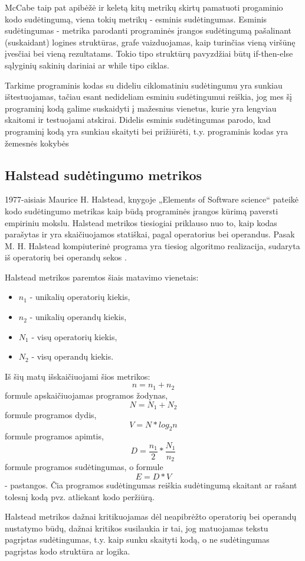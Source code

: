 \documentclass{VUMIFPSbakalaurinis}
\begin{document}
McCabe taip pat apibėžė ir keletą kitų metrikų skirtų pamatuoti progaminio kodo sudėtingumą, viena tokių metrikų - esminis sudėtingumas. Esminis sudėtingumas - metrika parodanti programinės įrangos sudėtingumą pašalinant (suskaidant) logines struktūras, grafe vaizduojamas, kaip turinčias vieną viršūnę įvesčiai bei vieną rezultatams. Tokio tipo struktūrų pavyzdžiai būtų if-then-else sąlyginių sakinių dariniai ar while tipo ciklas.

Tarkime programinis kodas su dideliu ciklomatiniu sudėtingumu yra sunkiau ištestuojamas, tačiau esant nedideliam esminiu sudėtingumui reiškia, jog mes šį programinį kodą galime suskaidyti į mažesnius vienetus, kurie yra lengviau skaitomi ir testuojami atskirai. Didelis esminis sudėtingumas parodo, kad programinį kodą yra sunkiau skaityti bei prižiūrėti, t.y. programinis kodas yra žemesnės kokybės

\subsection{Halstead sudėtingumo metrikos}
1977-aisiais Maurice H. Halstead, knygoje „Elements of Software science“ pateikė kodo sudėtingumo metrikas kaip būdą programinės įrangos kūrimą paversti empiriniu mokslu. Halstead metrikos tiesiogiai priklauso nuo to, kaip kodas parašytas ir yra skaičiuojamos statiškai, pagal operatorius bei operandus. Pasak M. H. Halstead kompiuterinė programa yra tiesiog algoritmo realizacija, sudaryta iš operatorių bei operandų sekos \cite{Halstead:1977:ESS:540137}.

Halstead metrikos paremtos šiais matavimo vienetais:
\begin{itemize}  
\item[]\(n_1\) - unikalių operatorių kiekis,
\item[]\(n_2\) - unikalių operandų kiekis,
\item[]\(N_1\) - visų operatorių kiekis,
\item[]\(N_2\) - visų operandų kiekis.
\end{itemize} 
Iš šių matų išskaičiuojami šios metrikos: \[n =  n_1 + n_2\]formule apskaičiuojamas programos žodynas, \[N = N_1 + N_2\]formule programos dydis, \[V = N * log_2n\]formule programos apimtis, \[D = \frac{n_1}{2} * \frac{N_1}{n_2}\]formule programos sudėtingumas, o formule \[E = D * V\] - pastangos. Čia programos sudėtingumas reiškia sudėtingumą skaitant ar rašant tolesnį kodą pvz. atliekant kodo peržiūrą.

Halstead metrikos dažnai kritikuojamas dėl neapibrėžto operatorių bei operandų nustatymo būdų, dažnai kritikos susilaukia ir tai, jog matuojamas tekstu pagrįstas sudėtingumas, t.y. kaip sunku skaityti kodą, o ne sudėtingumas pagrįstas kodo struktūra ar logika.
\end{document}
